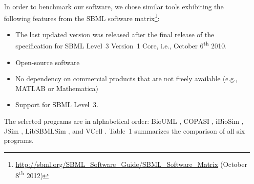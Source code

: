 \documentclass[10pt]{bmc_article}
\newenvironment{bmcformat}{\baselineskip20pt\sloppy\setboolean{publ}{false}}{\baselineskip20pt\sloppy}
\newcommand{\TODO}[1]{\textcolor{red}{\textbf{#1}}}
\begin{document}
\begin{bmcformat}
In order to benchmark our software, we chose similar tools exhibiting the
following features from the SBML software
matrix\footnote{\url{http://sbml.org/SBML_Software_Guide/SBML_Software_Matrix} (October 8\textsuperscript{th} 2012)}:
%
%
\begin{itemize}
  \item The last updated version was released after the final release of
  the specification for SBML Level~3 Version~1 Core, i.e., October
  6\textsuperscript{th} 2010.
  \item Open-source software
  \item No dependency on commercial products that are not freely available
  (e.g., MATLAB\texttrademark{} or Mathematica\texttrademark)
  \item Support for SBML Level~3. 
\end{itemize}
The selected programs are in alphabetical order:
BioUML \cite{Kolpakov2011, Kolpakov2006}, COPASI \cite{Hoops2006}, 
iBioSim \cite{Myers2009}, JSim \cite{Raymond2003}, LibSBMLSim 
\cite{Funahashi2012}, and VCell \cite{Moraru2008}.
Table~1 summarizes the comparison of all six programs.


\end{bmcformat}
\end{document}

